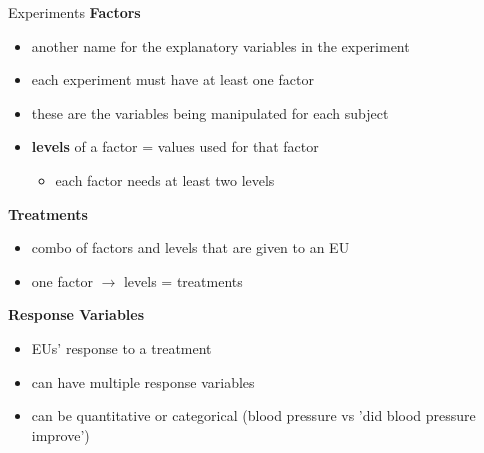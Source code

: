 \documentclass{beamer}
\begin{document}
\begin{frame}{Experiments}
\textbf{Factors}
\begin{itemize}
    \item another name for the explanatory variables in the experiment
    \item each experiment must have at least one factor
    \item these are the variables being manipulated for each subject
        \item \textbf{levels} of a factor = values used for that factor
    \begin{itemize}
        \item each factor needs at least two levels
    \end{itemize}
\end{itemize} \vspace{4mm}

\textbf{Treatments}
\begin{itemize}
    \item combo of factors and levels that are given to an EU
    \item one factor $\rightarrow$ levels = treatments
\end{itemize} \vspace{4mm}

\textbf{Response Variables}
\begin{itemize}
    \item EUs' response to a treatment
    \item can have multiple response variables
    \item can be quantitative or categorical (blood pressure vs 'did blood pressure improve')
\end{itemize}
\end{frame}
\end{document}
